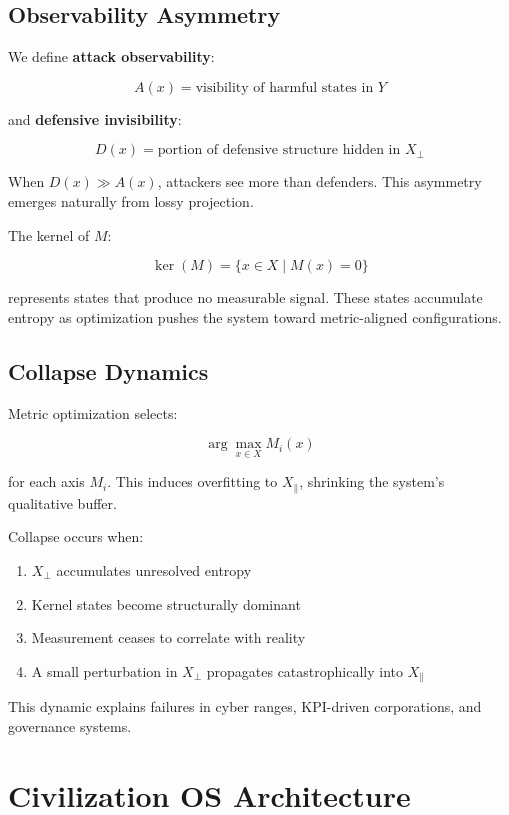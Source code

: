 \documentclass[11pt]{article}
\begin{document}
\subsection{Observability Asymmetry}

We define \textbf{attack observability}:

\[
A(x) = \text{visibility of harmful states in } Y
\]

and \textbf{defensive invisibility}:

\[
D(x) = \text{portion of defensive structure hidden in } X_{\perp}
\]

When $D(x) \gg A(x)$, attackers see more than defenders.
This asymmetry emerges naturally from lossy projection.

The kernel of $M$:

\[
\ker(M) = \{ x \in X \mid M(x) = 0 \}
\]

represents states that produce no measurable signal.
These states accumulate entropy as optimization pushes the system toward metric-aligned configurations.

\subsection{Collapse Dynamics}

Metric optimization selects:

\[
\arg\max_{x \in X} M_i(x)
\]

for each axis $M_i$.
This induces overfitting to $X_{\parallel}$, shrinking the system's qualitative buffer.

Collapse occurs when:

\begin{enumerate}[leftmargin=1.5em]
    \item $X_{\perp}$ accumulates unresolved entropy
    \item Kernel states become structurally dominant
    \item Measurement ceases to correlate with reality
    \item A small perturbation in $X_{\perp}$ propagates catastrophically into $X_{\parallel}$
\end{enumerate}

This dynamic explains failures in cyber ranges, KPI-driven corporations, and governance systems.

\section{Civilization OS Architecture}
\end{document}
